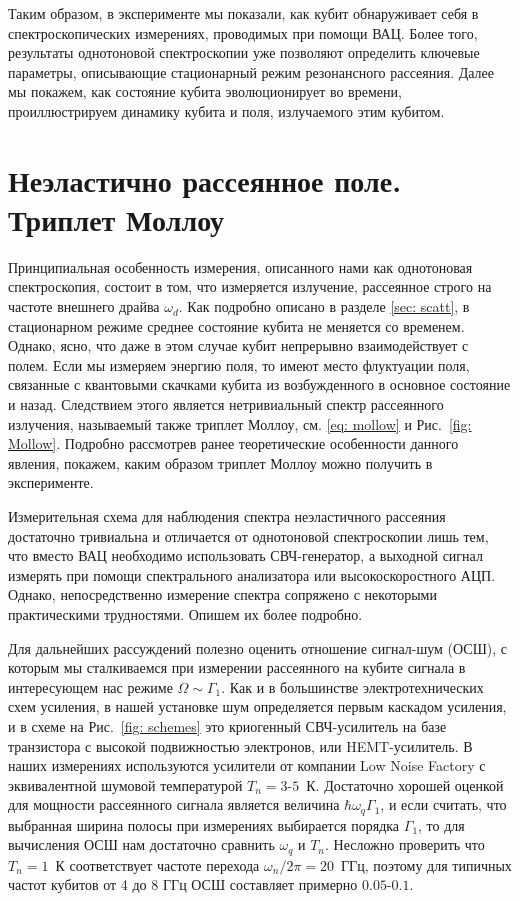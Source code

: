 Таким образом, в эксперименте мы показали, как кубит обнаруживает себя в спектроскопических измерениях, проводимых при помощи ВАЦ. Более того, результаты однотоновой спектроскопии уже позволяют определить ключевые параметры, описывающие стационарный режим резонансного рассеяния. Далее мы покажем, как состояние кубита эволюционирует во времени, проиллюстрируем динамику кубита и поля, излучаемого этим кубитом. 
\section{Неэластично рассеянное поле. Триплет Моллоу}
\label{sec: Triplet_meas}
Принципиальная особенность измерения, описанного нами как однотоновая спектроскопия, состоит в том, что измеряется излучение, рассеянное строго на частоте внешнего драйва $\omega_d$. Как подробно описано в разделе \ref{sec: scatt}, в стационарном режиме среднее состояние кубита не меняется со временем. Однако, ясно, что даже в этом случае кубит непрерывно взаимодействует с полем. Если мы измеряем энергию поля, то имеют место флуктуации поля, связанные с квантовыми скачками кубита из возбужденного в основное состояние и назад. Следствием этого является нетривиальный спектр рассеянного излучения, называемый также триплет Моллоу, см. \eqref{eq: mollow} и Рис.~\ref{fig: Mollow}. Подробно рассмотрев ранее теоретические особенности данного явления, покажем, каким образом триплет Моллоу можно получить в эксперименте.

Измерительная схема для наблюдения спектра неэластичного рассеяния достаточно тривиальна и отличается от однотоновой спектроскопии лишь тем, что вместо ВАЦ необходимо использовать СВЧ-генератор, а выходной сигнал измерять при помощи спектрального анализатора или высокоскоростного АЦП. Однако, непосредственно измерение спектра сопряжено с некоторыми практическими трудностями. Опишем их более подробно.

Для дальнейших рассуждений полезно оценить отношение сигнал-шум (ОСШ), с которым мы сталкиваемся при измерении рассеянного на кубите сигнала в интересующем нас режиме $\Omega \sim \Gamma_1$. Как и в большинстве электротехнических схем усиления, в нашей установке шум определяется первым каскадом усиления, и в схеме на Рис.~\ref{fig: schemes} это криогенный СВЧ-усилитель на базе транзистора с высокой подвижностью электронов, или HEMT-усилитель. В наших измерениях используются усилители от компании Low Noise Factory с эквивалентной шумовой температурой $T_n=3\text{-}5$~К. Достаточно хорошей оценкой для мощности рассеянного сигнала является величина $\hbar \omega_q\Gamma_1$, и если считать, что выбранная ширина полосы при измерениях выбирается порядка $\Gamma_1$, то для вычисления ОСШ нам достаточно сравнить $\omega_q$ и $T_n$. Несложно проверить что $T_n=1$~К соответствует частоте перехода $\omega_n/2\pi=20$~ГГц, поэтому для типичных частот кубитов от 4 до 8 ГГц ОСШ составляет примерно $0.05\text{-}0.1$. 

